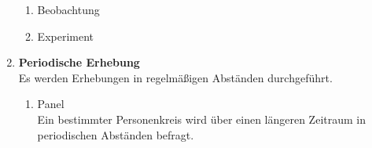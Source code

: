 \begin{flushleft}
\begin{enumerate}
{\begin{enumerate}
{\begin{enumerate}
                        \item Ein-Themen-Befragung
                        \item Mehr-Themen-Befragung
                        \item Unternehmensbefragung
                        \item Verbraucherbefragung
                        \item Expertenbefragung
                        \item Schriftliche Befragung
                        \item Telefonische Befragung
                        \item Mündliche Befragung
                        \item Onlinebefragung
                        \item Einmalbefragung
                        \item Mehrfachbefragung
                        \item Standardisiertes Interview
                        \item Strukturiertes Interview
                        \item Freies Gespräch
                        \item Direkte Befragungstaktik
                        \item Indirekte Befragungstaktik
                    \end{enumerate}
                }
                \item Beobachtung
                \item Experiment
            \end{enumerate}
        }
        \item {
            \textbf{Periodische Erhebung} \\
            Es werden Erhebungen in regelmäßigen Abständen durchgeführt.
            \begin{enumerate}
                \item {
                    Panel \\
                    Ein bestimmter Personenkreis wird über einen längeren Zeitraum in periodischen Abständen befragt.
                }
            \end{enumerate}
        }
    \end{enumerate}
\end{flushleft}